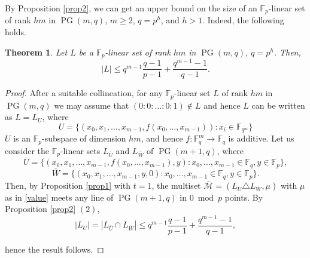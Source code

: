 \documentclass[12pt]{article}
\newcommand{\cM}{{\mathcal M}}
\newcommand{\F}{{\mathbb F}}
\newtheorem{theorem}{Theorem}[section]
\DeclareMathOperator{\PG}{{PG}}
\begin{document}
By Proposition \ref{prop2}, we can get an upper bound on the size of an $\F_p$-linear set of rank $hm$ in $\PG(m,q)$, $m \geq 2$, $q=p^h$, and $h >1$. Indeed, the following holds.

\begin{theorem} \label{direction}
	Let $L$ be a $\F_p$-linear set of rank $hm$ in $\PG(m,q)$, $q=p^h$. Then,
	\[\vert L \vert \leq q^{m-1}\frac{q-1}{p-1}+\frac{q^{m-1}-1 }{q-1}.\]
\end{theorem}

\begin{proof}
	After a suitable collineation, for any $\F_p$-linear set $L$ of rank $hm$ in $\PG(m,q)$ we may assume that $(0:0:\ldots :0:1)\notin L$ and hence $L$ can be written as $L=L_U$,  where
	\[U=\{(x_0,x_1,\ldots,x_{m-1}, f(x_0,\ldots,x_{m-1})) : x_i \in \F_{q^m}\}\] 
	$U$ is an $\F_p$-subspace of dimension $hm$, and hence $f\colon \F_{q}^{m} \rightarrow \F_q$ is additive. 
	Let us consider  the $\F_p$-linear sets $L_{\overline{U}}$ and $L_{\overline{W}}$ of $\PG(m+1,q)$, 
	where
	\[
	\overline{U}=\{(x_0,x_1,\ldots,x_{m-1},f(x_0,\ldots,x_{m-1}), y): x_0,\ldots,x_{m-1} \in \F_q, y \in \F_p\},
	\]
	\[
	\overline{W}=\{(x_0,x_1,\ldots,x_{m-1},y,0): x_0,\ldots,x_{m-1} \in \F_q, y \in \F_p\}.
	\]
	Then, by Proposition \ref{prop1} with $t=1$, the multiset $\bar{\cM}=(L_{\overline{U}} \triangle L_{\overline{W}}, \mu)$ with $\mu$ as in \eqref{value}
	meets any line of $\PG(m+1,q)$ in $0 \bmod p$ points.
	By Proposition \ref{prop2} $(2)$,
		\[
		|L_U| =|L_{\overline{U}} \cap L_{\overline{W}}|  \leq q^{m-1}\frac{q-1}{p-1}+\frac{q^{m-1}-1 }{q-1},
		\]
		
		hence the result follows.
	\end{proof}
	
\end{document}
